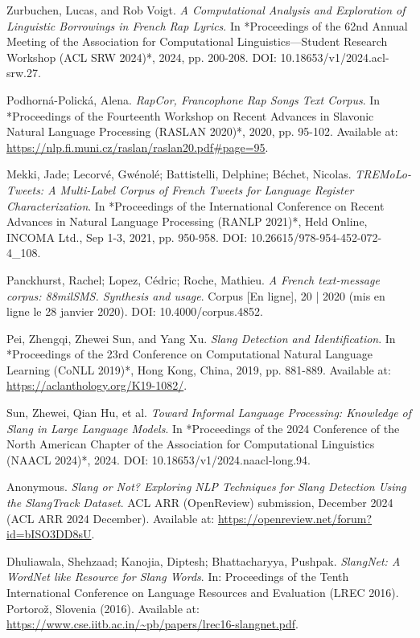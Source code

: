 \documentclass[12pt]{article}
\begin{document}
\begin{thebibliography}{9}
Zurbuchen, Lucas, and Rob Voigt.  
\textit{A Computational Analysis and Exploration of Linguistic Borrowings in French Rap Lyrics}.  
In *Proceedings of the 62nd Annual Meeting of the Association for Computational Linguistics\;---\;Student Research Workshop (ACL SRW 2024)*, 2024, pp. 200-208.  
DOI: 10.18653/v1/2024.acl-srw.27.  

Podhorná-Polická, Alena.  
\textit{RapCor, Francophone Rap Songs Text Corpus}.  
In *Proceedings of the Fourteenth Workshop on Recent Advances in Slavonic Natural Language Processing (RASLAN 2020)*, 2020, pp. 95-102.  
Available at: \url{https://nlp.fi.muni.cz/raslan/raslan20.pdf#page=95}.  %

Mekki, Jade; Lecorvé, Gwénolé; Battistelli, Delphine; Béchet, Nicolas.  
\textit{TREMoLo-Tweets: A Multi-Label Corpus of French Tweets for Language Register Characterization}.  
In *Proceedings of the International Conference on Recent Advances in Natural Language Processing (RANLP 2021)*, Held Online, INCOMA Ltd., Sep 1-3, 2021, pp. 950-958.  
DOI: 10.26615/978-954-452-072-4\_108.  

Panckhurst, Rachel; Lopez, Cédric; Roche, Mathieu.  
\textit{A French text-message corpus: 88milSMS. Synthesis and usage}.  
Corpus [En ligne], 20 | 2020 (mis en ligne le 28 janvier 2020).  
DOI: 10.4000/corpus.4852.  

Pei, Zhengqi, Zhewei Sun, and Yang Xu.  
\textit{Slang Detection and Identification}.  
In *Proceedings of the 23rd Conference on Computational Natural Language Learning (CoNLL 2019)*, Hong Kong, China, 2019, pp. 881-889.  
Available at: \url{https://aclanthology.org/K19-1082/}.  %

Sun, Zhewei, Qian Hu, et al.  
\textit{Toward Informal Language Processing: Knowledge of Slang in Large Language Models}.  
In *Proceedings of the 2024 Conference of the North American Chapter of the Association for Computational Linguistics (NAACL 2024)*, 2024.  
DOI: 10.18653/v1/2024.naacl-long.94.  

Anonymous.  
\textit{Slang or Not? Exploring NLP Techniques for Slang Detection Using the SlangTrack Dataset}.  
ACL ARR (OpenReview) submission, December 2024 (ACL ARR 2024 December).  
Available at: \url{https://openreview.net/forum?id=bISO3DD8sU}.

Dhuliawala, Shehzaad; Kanojia, Diptesh; Bhattacharyya, Pushpak.  
\textit{SlangNet: A WordNet like Resource for Slang Words}.  
In: Proceedings of the Tenth International Conference on Language Resources and Evaluation (LREC 2016).  
Portorož, Slovenia (2016).  
Available at: \url{https://www.cse.iitb.ac.in/~pb/papers/lrec16-slangnet.pdf}.


\end{thebibliography}
\end{document}
